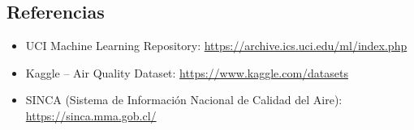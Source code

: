 \documentclass[12pt,a4paper]{article}
\begin{document}
\subsection{Referencias}
\begin{itemize}
    \item UCI Machine Learning Repository: \url{https://archive.ics.uci.edu/ml/index.php}
    \item Kaggle – Air Quality Dataset: \url{https://www.kaggle.com/datasets}
    \item SINCA (Sistema de Información Nacional de Calidad del Aire): \url{https://sinca.mma.gob.cl/}
\end{itemize}
\end{document}
